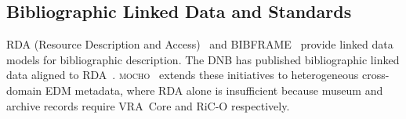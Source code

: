\subsection{Bibliographic Linked Data and Standards}

RDA (Resource Description and Access)~ and
BIBFRAME~ provide linked data models for bibliographic
description.
The DNB has published bibliographic linked data aligned to
RDA~\cite{dnb2022rda}.
\textsc{mocho}~\cite{tan2026mocho} extends these initiatives to heterogeneous
cross-domain EDM metadata, where RDA alone is insufficient because museum
and archive records require VRA~Core and RiC-O respectively.
